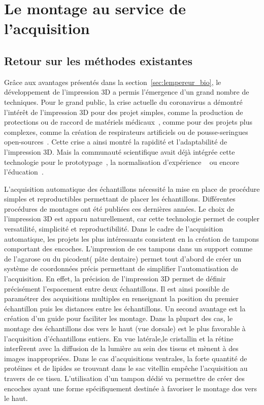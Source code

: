 \documentclass[\main/main.tex]{subfiles}
\begin{document}
\section{
    \label{sec:montage}
    Le montage au service de l'acquisition
    }

    \subsection{Retour sur les méthodes existantes}
    
%
Grâce aux avantages présentés dans la section~\ref{sec:lempereur_bio}, le développement de l'impression 3D a permis l'émergence d'un grand nombre de techniques.
%
Pour le grand public, la crise actuelle du coronavirus a démontré l'intérêt de l'impression 3D
pour des projet simples, comme la production de protections ou de raccord de matériels médicaux~\cite{callahan_2020,ishack_2020,wesemann_2020}, comme pour des projets plus complexes, comme la création de respirateurs artificiels ou de pousse-seringues open-sources~\cite{na_website_nda}.
%
Cette crise a ainsi montré la rapidité et l'adaptabilité de l'impression 3D.
%
Mais la communauté scientifique avait déjà intégrée cette technologie pour le prototypage~\cite{he_2016}, la normalisation d'expérience ~\cite{pinskiy_2013} ou encore l'éducation~\cite{maiachagas_2017}.
    
%
L'acquisition automatique des échantillons nécessité la mise en place de procédure simples
et reproductibles permettant de placer les échantillons.
%
Différentes procédures de montages ont été publiées ces dernières années.
%
Le choix de l'impression 3D est apparu naturellement, car cette technologie permet de coupler versatilité, simplicité et reproductibilité.
%
Dans le cadre de l'acquisition automatique, les projets les plus intéressants consistent en la création de tampons comportant des encoches.
%
L'impression de ces tampons dans un support comme de l'agarose ou du picodent( pâte dentaire) permet tout d'abord de créer un système de coordonnées précis
permettant de simplifier l'automatisation de l'acquisition. En effet, la précision de l'impression 3D permet de définir précisément l'espacement entre deux échantillons.
Il est ainsi possible de paramétrer des acquisitions multiples en renseignant la position du premier échantillon puis les distances entre les échantillons.
%
Un second avantage est la création d'un guide pour faciliter les montage. Dans la plupart des cas, le montage des échantillons dos vers le haut (vue dorsale)
est le plus favorable à l'acquisition d'échantillons entiers. En vue latérale,le cristallin et la rétine interfèrent avec la diffusion de la lumière au sein des tissus et mènent à des images inappropriées.
Dans le cas d'acquisitions ventrales, la forte quantité de protéines et de lipides se trouvant dans le sac vitellin empêche l'acquisition au travers de ce tissu.
%
L'utilisation d'un tampon dédié va permettre de créer des encoches ayant une forme spécifiquement destinée à favoriser le montage dos vers le haut.
\end{document}
